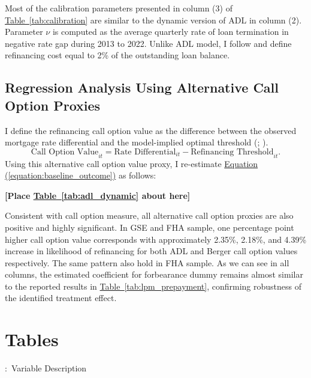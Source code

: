 \documentclass[11pt]{article}
\begin{document}
{Most of the calibration parameters presented in column (3) of \hyperref[tab:calibration]{Table~\ref*{tab:calibration}} are similar to the dynamic version of ADL in column (2). Parameter $\nu$ is computed as the average quarterly rate of loan termination in negative rate gap during 2013 to 2022. Unlike ADL model, I follow \citet{berger2024optimal} and define refinancing cost equal to 2\% of the outstanding loan balance.    

\subsection{Regression Analysis Using Alternative Call Option Proxies}

I define the refinancing call option value as the difference between the observed mortgage rate differential and the model-implied optimal threshold (\citet{fuster2019role}; \citet{gerardi2023mortgage}). 
\[
\text{Call Option Value}_{it} = \text{Rate Differential}_{it} -  \text{Refinancing Threshold}_{it}.
\]
Using this alternative call option value proxy, I re-estimate \hyperref[equation:baseline_outcome]{Equation (\ref*{equation:baseline_outcome})} as follows:

\bigskip
\centerline{\bf [Place \hyperref[tab:adl_dynamic]{Table~\ref*{tab:adl_dynamic}} about here]}
\bigskip

Consistent with \citet{deng2000mortgage} call option measure, all alternative call option proxies are also positive and highly significant. In GSE and FHA sample, one percentage point higher call option value corresponds with approximately 2.35\%, 2.18\%, and 4.39\%  increase in likelihood of refinancing for both ADL and Berger call option values respectively. The same pattern also hold in FHA sample. As we can see in all columns, the estimated coefficient for forbearance dummy remains almost similar to the reported results in \hyperref[tab:lpm_prepayment]{Table~\ref*{tab:lpm_prepayment}}, confirming robustness of the identified treatment effect.   


\clearpage
\section{Tables}


\begin{table}[!h]
\captionsetup{justification=justified,singlelinecheck=false}
\footnotesize
\caption{:\ Variable Description}
\label{tab:description}
\vspace{0.5em}


\end{table}}
\end{document}

